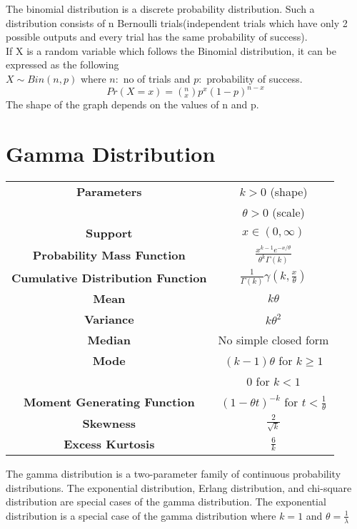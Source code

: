 \documentclass[14pt, a4paper]{article}
\theoremstyle{definition}
\begin{document}
  
The binomial distribution is a discrete probability distribution. Such a distribution consists of n Bernoulli trials(independent trials which have only 2 possible outputs and every trial has the same probability of success). 
\\ If X is a random variable which follows the Binomial distribution, it can be expressed as the following
\\ $X \sim Bin(n,p)$ where $n:$ no of trials and $p:$ probability of success. 
\[Pr(X=x) = (^n_x)p^x(1-p)^{n-x}\]
The shape of the graph depends on the values of n and p.


\section{Gamma Distribution}


\begin{tabular}{|c|c|}  %
\hline
 \textbf{Parameters }&  $k > 0$ (shape) \\ & $\theta > 0$ (scale)\\
 \hline
 \textbf{Support} &  $x \in (0, \infty) $\\
 \hline
 \textbf{Probability Mass Function} &  $\frac{x^{k-1}e^{-x/\theta}}{\theta^k \Gamma(k)}$ \\
 \hline
 \textbf{Cumulative Distribution Function} & $\frac{1}{\Gamma(k)} \gamma(k, \frac{x}{\theta} )$ \\
 \hline
 \textbf{Mean} & $k \theta$ \\ 
 \hline
 \textbf{Variance} & $k \theta^2$ \\
 \hline
 \textbf{Median} &  No simple closed form \\ 
 \hline
 \textbf{Mode} & $(k-1)\theta$ for $k \geq 1$ \\ & $0$ for $k < 1$ \\
 \hline
 \textbf{Moment Generating Function} & $(1 - \theta t)^{-k} $ for $t < \frac{1}{\theta}$\\
 \hline
 \textbf{Skewness} & $\frac{2}{\sqrt{k}}$ \\
 \hline
 \textbf{Excess Kurtosis} & $\frac{6}{k}$  \\
 \hline
       
  \end{tabular}
 
The gamma distribution is a two-parameter family of continuous probability distributions. The exponential distribution, Erlang distribution, and chi-square distribution are special cases of the gamma distribution. The exponential distribution is a special case of the gamma distribution where $k = 1$ and $\theta = \frac{1}{\lambda}$
  
\end{document}
